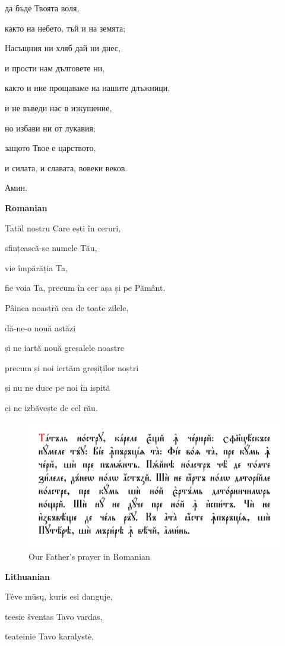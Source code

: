 да бъде Твоята воля,

както на небето, тъй и на земята;

Насъщния ни хляб дай ни днес,

и прости нам дълговете ни,

както и ние прощаваме на нашите длъжници,

и не въведи нас в изкушение,

но избави ни от лукавия;

защото Твое е царството,

и силата, и славата, вовеки веков.

Амин.

\textbf{Romanian}

Tatăl nostru Care ești în ceruri,

sfințească-se numele Tău,

vie împărăția Ta,

fie voia Ta, precum în cer așa și pe Pământ.

Pâinea noastră cea de toate zilele,

dă-ne-o nouă astăzi

și ne iartă nouă greșalele noastre

precum și noi iertăm greșiților noștri

și nu ne duce pe noi în ispită

ci ne izbăvește de cel rău.

\begin{figure}
	\includegraphics[width=\linewidth]{./sources/of-romanian.png}
	\caption{Our Father's prayer in Romanian}
	\label{fig:of-romanian}
\end{figure}

\textbf{Lithuanian}

Tėve mūsų, kuris esi danguje, 

teesie šventas Tavo vardas,

teateinie Tavo karalystė,

